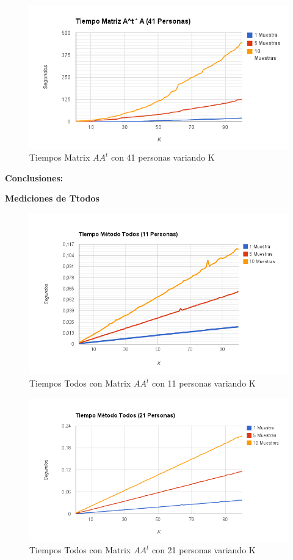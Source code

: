 \begin{figure}[H]
\includegraphics[width=1\textwidth]{img/imagec.png}
     \caption{Tiempos Matrix $AA^t$ con 41 personas variando K}
\end{figure}

\textbf{Conclusiones:}

\textbf{Mediciones de Ttodos }

\begin{figure}[H]
\includegraphics[width=1\textwidth]{img/imaged.png}
     \caption{Tiempos Todos con Matrix $AA^t$ con 11 personas variando K}
\end{figure}

\begin{figure}[H]
\includegraphics[width=1\textwidth]{img/imagee.png}
     \caption{Tiempos Todos con Matrix $AA^t$ con 21 personas variando K}
\end{figure}


